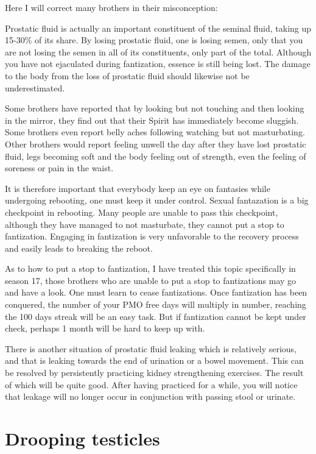 \documentclass[
]{book}
\begin{document}
Here I will correct many brothers in their misconception:

Prostatic fluid is actually an important constituent of the seminal fluid, taking up 15-30\% of its share. By losing prostatic fluid, one is losing semen, only that you are not losing the semen in all of its constituents, only part of the total. Although you have not ejaculated during fantization, essence is still being lost. The damage to the body from the loss of prostatic fluid should likewise not be underestimated.

Some brothers have reported that by looking but not touching and then looking in the mirror, they find out that their Spirit has immediately become sluggish. Some brothers even report belly aches following watching but not masturbating. Other brothers would report feeling unwell the day after they have lost prostatic fluid, legs becoming soft and the body feeling out of strength, even the feeling of soreness or pain in the waist.

It is therefore important that everybody keep an eye on fantasies while undergoing rebooting, one must keep it under control. Sexual fantazation is a big checkpoint in rebooting. Many people are unable to pass this checkpoint, although they have managed to not masturbate, they cannot put a stop to fantization. Engaging in fantization is very unfavorable to the recovery process and easily leads to breaking the reboot.

As to how to put a stop to fantization, I have treated this topic specifically in season 17, those brothers who are unable to put a stop to fantizations may go and have a look. One must learn to cease fantizations. Once fantization has been conquered, the number of your PMO free days will multiply in number, reaching the 100 days streak will be an easy task. But if fantization cannot be kept under check, perhaps 1 month will be hard to keep up with.

There is another situation of prostatic fluid leaking which is relatively serious, and that is leaking towards the end of urination or a bowel movement. This can be resolved by persistently practicing kidney strengthening exercises. The result of which will be quite good. After having practiced for a while, you will notice that leakage will no longer occur in conjunction with passing stool or urinate.

\hypertarget{drooping-testicles}{%
\section{Drooping testicles}\label{drooping-testicles}}
\end{document}
